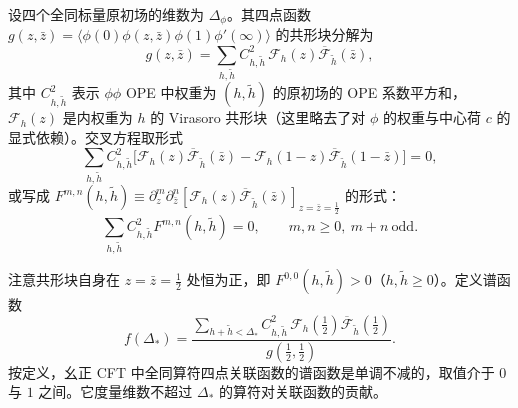 设四个全同标量原初场的维数为 $\Delta_\phi$。其四点函数 $g(z,\bar z)=\langle\phi(0)\phi(z,\bar z)\phi(1)\phi'(\infty)\rangle$ 的共形块分解为
\begin{equation}
  \label{eq:5-12}
  g(z,\bar z)=\sum_{h,\tilde h}C^2_{h,\tilde h}\,\mathcal{F}_h(z)\overline{\mathcal{F}}_{\tilde h}(\bar z),
\end{equation}
其中 $C^2_{h,\tilde h}$ 表示 $\phi\phi$ OPE 中权重为 $(h,\tilde h)$ 的原初场的 OPE 系数平方和，$\mathcal{F}_h(z)$ 是内权重为 $h$ 的 Virasoro 共形块（这里略去了对 $\phi$ 的权重与中心荷 $c$ 的显式依赖）。交叉方程取形式
\begin{equation}
  \label{eq:5-13}
  \sum_{h,\tilde h}C^2_{h,\tilde h}\bigl[\mathcal{F}_h(z)\overline{\mathcal{F}}_{\tilde h}(\bar z)
  -\mathcal{F}_h(1-z)\overline{\mathcal{F}}_{\tilde h}(1-\bar z)\bigr]=0,
\end{equation}
或写成 $F^{m,n}(h,\tilde h)\equiv\partial_z^m\partial_{\bar z}^n[\mathcal{F}_h(z)\overline{\mathcal{F}}_{\tilde h}(\bar z)]_{z=\bar z=\frac12}$ 的形式：
\begin{equation}
  \label{eq:5-14}
  \sum_{h,\tilde h}C^2_{h,\tilde h}F^{m,n}(h,\tilde h)=0,\qquad m,n\ge0,\ m+n\ \text{odd} .
\end{equation}

注意共形块自身在 $z=\bar z=\frac12$ 处恒为正，即 $F^{0,0}(h,\tilde h)>0$（$h,\tilde h\ge0$）。定义谱函数
\begin{equation}
  \label{eq:5-15}
  f(\Delta_*)=\frac{\sum_{h+\tilde h<\Delta_*}C^2_{h,\tilde h}\,
  \mathcal{F}_h(\frac12)\overline{\mathcal{F}}_{\tilde h}(\frac12)}
  {g(\frac12,\frac12)} .
\end{equation}
按定义，幺正 CFT 中全同算符四点关联函数的谱函数是单调不减的，取值介于 $0$ 与 $1$ 之间。它度量维数不超过 $\Delta_*$ 的算符对关联函数的贡献。

